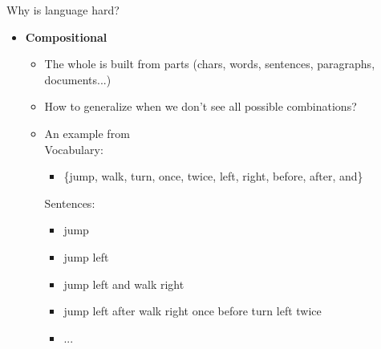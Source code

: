 \documentclass[usenames,dvipsnames,notes,11pt,aspectratio=169]{beamer}
\begin{document}
\begin{frame}
    {Why is language hard?}
    \begin{itemize}
        \item \textbf{Compositional}
            \begin{itemize}
                \item The whole is built from parts (chars, words, sentences, paragraphs, documents...)
                \item How to generalize when we don't see all possible combinations?\\
                \item An example from \\
                Vocabulary:\\
                    \begin{itemize}
                    \item[]\{jump, walk, turn, once, twice, left, right, before, after, and\}
                    \end{itemize}
                Sentences: \\
                    \begin{itemize}
                       \item[]jump \\
                       \item[]jump left\\
                       \item[]jump left and walk right \\
                       \item[]jump left after walk right once before turn left twice\\
                       \item[]...
                    \end{itemize}
            \end{itemize}
    \end{itemize}
\end{frame}
\end{document}
